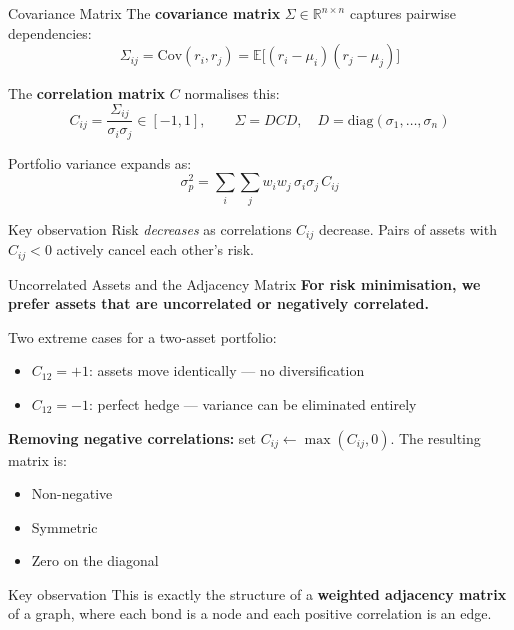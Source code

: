 \documentclass[aspectratio=169]{beamer}
\begin{document}
\begin{frame}{Covariance Matrix}
    The \textbf{covariance matrix} $\Sigma \in \mathbb{R}^{n \times n}$ captures pairwise dependencies:
    \[
        \Sigma_{ij} = \mathrm{Cov}(r_i, r_j)
        = \mathbb{E}\bigl[(r_i - \mu_i)(r_j - \mu_j)\bigr]
    \]

    \bigskip
    The \textbf{correlation matrix} $C$ normalises this:
    \[
        C_{ij} = \frac{\Sigma_{ij}}{\sigma_i \sigma_j} \in [-1, 1],
        \qquad \Sigma = D C D,\quad D = \mathrm{diag}(\sigma_1, \ldots, \sigma_n)
    \]

    \bigskip
    Portfolio variance expands as:
    \[
        \sigma_p^2 = \sum_{i}\sum_{j} w_i w_j\, \sigma_i \sigma_j\, C_{ij}
    \]

    \medskip
    \begin{block}{Key observation}
        Risk \emph{decreases} as correlations $C_{ij}$ decrease.
        Pairs of assets with $C_{ij} < 0$ actively cancel each other's risk.
    \end{block}
\end{frame}

\begin{frame}{Uncorrelated Assets and the Adjacency Matrix}
    \textbf{For risk minimisation, we prefer assets that are uncorrelated or negatively correlated.}

    \bigskip
    Two extreme cases for a two-asset portfolio:
    \begin{itemize}
        \item $C_{12} = +1$: assets move identically — no diversification
        \item $C_{12} = -1$: perfect hedge — variance can be eliminated entirely
    \end{itemize}

    \bigskip
    \textbf{Removing negative correlations:} set $C_{ij} \leftarrow \max(C_{ij}, 0)$.
    The resulting matrix is:
    \begin{itemize}
        \item Non-negative
        \item Symmetric
        \item Zero on the diagonal
    \end{itemize}

    \medskip
    \begin{block}{Key observation}
        This is exactly the structure of a \textbf{weighted adjacency matrix} of a graph,
        where each bond is a node and each positive correlation is an edge.
    \end{block}
\end{frame}
\end{document}
